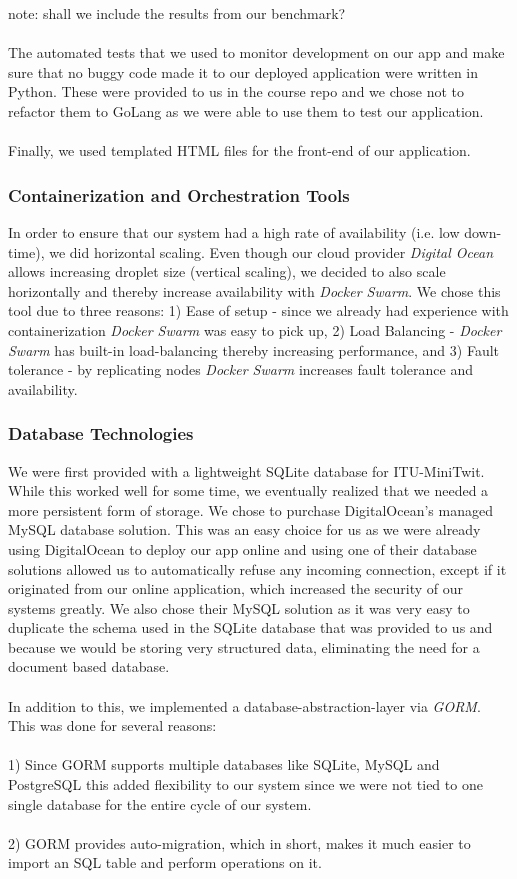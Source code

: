 \documentclass{article}
\begin{document}
note: shall we include the results from our benchmark?
\\\\
The automated tests that we used to monitor development on our app and make sure that no buggy code made it to our deployed application were written in Python. These were provided to us in the course repo and we chose not to refactor them to GoLang as we were able to use them to test our application.
\\\\
Finally, we used templated HTML files for the front-end of our application.

\subsubsection{Containerization and Orchestration Tools}
In order to ensure that our system had a high rate of availability (i.e. low down-time), we did horizontal scaling. Even though our cloud provider \textit{Digital Ocean} allows increasing droplet size (vertical scaling), we decided to also scale horizontally and thereby increase availability with \textit{Docker Swarm}. We chose this tool due to three reasons: 1) Ease of setup - since we already had experience with containerization \textit{Docker Swarm} was easy to pick up, 2) Load Balancing - \textit{Docker Swarm} has built-in load-balancing thereby increasing performance, and 3) Fault tolerance - by replicating nodes \textit{Docker Swarm} increases fault tolerance and availability.

\subsubsection{Database Technologies}
We were first provided with a lightweight SQLite database for ITU-MiniTwit. While this worked well for some time, we eventually realized that we needed a more persistent form of storage. We chose to purchase DigitalOcean's managed MySQL database solution. This was an easy choice for us as we were already using DigitalOcean to deploy our app online and using one of their database solutions allowed us to automatically refuse any incoming connection, except if it originated from our online application, which increased the security of our systems greatly. We also chose their MySQL solution as it was very easy to duplicate the schema used in the SQLite database that was provided to us and because we would be storing very structured data, eliminating the need for a document based database.
\\\\
In addition to this, we implemented a database-abstraction-layer via \textit{GORM}. This was done for several reasons:
\\\\
1) Since GORM supports multiple databases like SQLite, MySQL and PostgreSQL this added flexibility to our system since we were not tied to one single database for the entire cycle of our system.
\\\\
2) GORM provides auto-migration, which 
in short, makes it much easier to import an SQL table and perform operations on it. 
\end{document}
